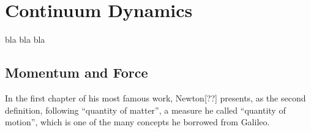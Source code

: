 \chapter{Continuum Dynamics}

bla bla bla        


\section{Momentum and Force}

In the first chapter of his most famous work, Newton[??] presents, as the second definition, following ``quantity of matter'', a measure he called ``quantity of motion'', which is one of the many concepts he borrowed from Galileo.   

